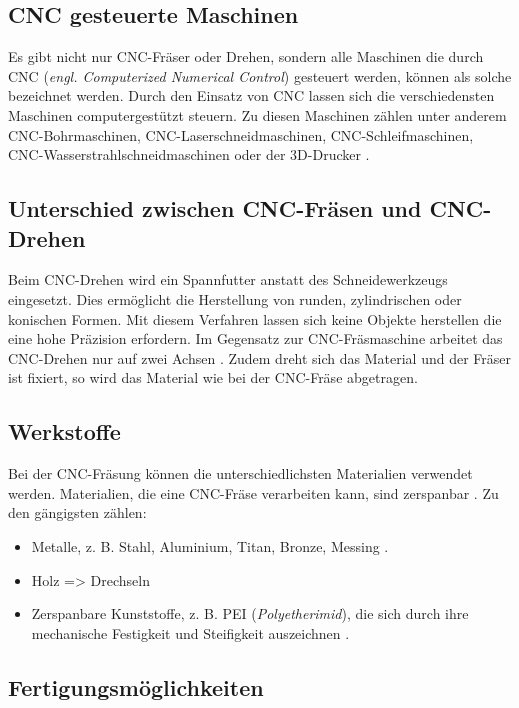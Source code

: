 \subsection{CNC gesteuerte Maschinen}
Es gibt nicht nur CNC-Fräser oder Drehen, sondern alle Maschinen die durch CNC (\emph{engl. Computerized Numerical Control}) gesteuert werden, können als solche bezeichnet werden. Durch den Einsatz von CNC lassen sich die verschiedensten Maschinen computergestützt steuern. Zu diesen Maschinen zählen unter anderem CNC-Bohrmaschinen,  CNC-Laserschneidmaschinen, CNC-Schleifmaschinen, CNC-Wasserstrahlschneidmaschinen oder der 3D-Drucker \textcite{ArtenCNCMaschinen}
. \\


\subsection{Unterschied zwischen CNC-Fräsen und CNC-Drehen}
Beim CNC-Drehen wird ein Spannfutter anstatt des Schneidewerkzeugs eingesetzt. Dies ermöglicht die Herstellung von runden, zylindrischen oder konischen Formen. Mit diesem Verfahren lassen sich keine Objekte herstellen die eine hohe Präzision erfordern. Im Gegensatz zur CNC-Fräsmaschine arbeitet das CNC-Drehen nur auf zwei Achsen \textcite{CNCDrehenUnterschied}. Zudem dreht sich das Material und der Fräser ist fixiert, so wird das Material wie bei der CNC-Fräse abgetragen. \\



\subsection{Werkstoffe}
Bei der CNC-Fräsung können die unterschiedlichsten Materialien verwendet werden. Materialien, die eine CNC-Fräse verarbeiten kann, sind zerspanbar  \textcite{PEIZerspannung}. Zu den gängigsten zählen:

\begin{itemize}
	\item Metalle, z. B. Stahl, Aluminium, Titan, Bronze, Messing \textcite{CNCFraesen3}.
	\item Holz => Drechseln
	\item Zerspanbare Kunststoffe, z. B. PEI (\emph{Polyetherimid}), die sich durch ihre mechanische Festigkeit und Steifigkeit auszeichnen  \textcite{PEIKunststoffPolyetherimid}.
\end{itemize}


\subsection{Fertigungsmöglichkeiten}


